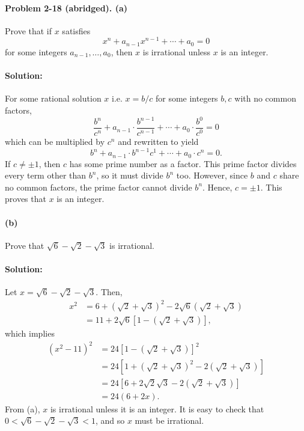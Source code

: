 \documentclass{article}
\begin{document}
\paragraph{Problem 2-18 (abridged). (a)} Prove that if $x$ satisfies
\begin{equation*}
  x^n + a_{n-1}x^{n-1} + \cdots + a_0 = 0
\end{equation*} for some integers $a_{n-1}, \ldots, a_0$, then $x$ is
irrational unless $x$ is an integer.

\paragraph{Solution:} For some rational solution $x$ i.e. $x = b/c$ for some
integers $b, c$ with no common factors, \begin{equation*}
  \frac{b^n}{c^n} + a_{n-1} \cdot \frac{b^{n-1}}{c^{n-1}} + \cdots + a_0 \cdot
  \frac{b^0}{c^0} = 0
\end{equation*} which can be multiplied by $c^n$ and rewritten to yield
\begin{equation*}
  b^n + a_{n-1} \cdot b^{n-1}c^1 + \cdots + a_0 \cdot c^n = 0.
\end{equation*}
If $c \neq \pm1$, then $c$ has some prime number as a factor. This prime factor
divides every term other than $b^n$, so it must divide $b^n$ too. However,
since $b$ and $c$ share no common factors, the prime factor cannot divide
$b^n$. Hence, $c = \pm1$. This proves that $x$ is an integer.

\paragraph{(b)} Prove that $\sqrt{6} - \sqrt{2} - \sqrt{3}$ is irrational.

\paragraph{Solution:} Let $x = \sqrt{6} - \sqrt{2} - \sqrt{3}$. Then,
\begin{align*}
  x^2 &= 6 + (\sqrt{2} + \sqrt{3})^2 - 2\sqrt{6}(\sqrt{2} + \sqrt{3}) \\
    &= 11 + 2\sqrt{6}[1 - (\sqrt{2} + \sqrt{3})],
\end{align*} which implies \begin{align*}
  (x^2 - 11)^2 &= 24[1 - (\sqrt{2} + \sqrt{3})]^2 \\
    &= 24[1 + (\sqrt{2} + \sqrt{3})^2 - 2(\sqrt{2} + \sqrt{3})] \\
    &= 24[6 + 2\sqrt{2}\sqrt{3} - 2(\sqrt{2} + \sqrt{3})] \\
    &= 24(6 + 2x).
\end{align*}
From (a), $x$ is irrational unless it is an integer. It is easy to check that
$0 < \sqrt{6} - \sqrt{2} - \sqrt{3} < 1$, and so $x$ must be irrational.
\end{document}
